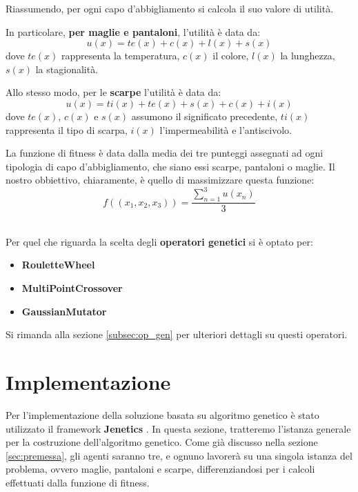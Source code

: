 \documentclass[a4paper, 11pt, oneside]{report}
\begin{document}
            \newpage
            \par \noindent Riassumendo, per ogni capo d'abbigliamento si calcola il suo valore di utilità.
            \\
            \par \noindent In particolare, \textbf{per maglie e pantaloni}, l'utilità è data da:
            \[
                u(x)=te(x)+c(x)+l(x)+s(x)
            \]
            dove $te(x)$ rappresenta la temperatura, $c(x)$ il colore, $l(x)$ la lunghezza, $s(x)$ la stagionalità.
            \\
            \par \noindent Allo stesso modo, per le \textbf{scarpe} l'utilità è data da:
            \[
                u(x)=ti(x)+te(x)+s(x)+c(x)+i(x)
            \]
            dove $te(x)$, $c(x)$ e $s(x)$ assumono il significato precedente, $ti(x)$ rappresenta il tipo di scarpa,
            $i(x)$ l'impermeabilità e l'antiscivolo.
            \\
            \par \noindent La funzione di fitness è data dalla media dei tre punteggi assegnati
            ad ogni tipologia di capo d'abbigliamento, che siano essi scarpe, pantaloni o maglie. Il nostro obbiettivo,
            chiaramente, è quello di massimizzare questa funzione:
            \[
                f((x_{1},x_{2},x_{3}))=\frac{\sum_{n=1}^{3} u(x_{n})}{3}
            \]
            \\
            \par \noindent Per quel che riguarda la scelta degli \textbf{operatori genetici} si è optato per:
            \begin{itemize}
                \item \textbf{RouletteWheel}
                \item \textbf{MultiPointCrossover}
                \item \textbf{GaussianMutator}
            \end{itemize}
            Si rimanda alla sezione \ref{subsec:op_gen} per ulteriori dettagli su questi operatori.

            \newpage
            \section{Implementazione}
            Per l'implementazione della soluzione basata su algoritmo genetico è stato utilizzato il framework
            \textbf{Jenetics} \cite{1}. In questa sezione, tratteremo l'istanza generale per la costruzione dell'algoritmo
            genetico. Come già discusso nella sezione \ref{sec:premessa}, gli agenti saranno tre, e ognuno lavorerà su una singola istanza
            del problema, ovvero maglie, pantaloni e scarpe, differenziandosi per i calcoli effettuati dalla funzione di
            fitness.
\end{document}
